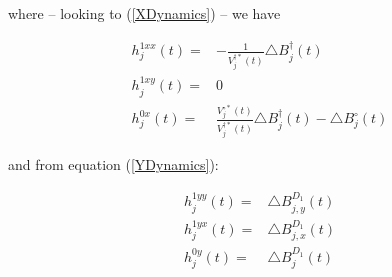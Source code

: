 \documentclass{article}
\newcommand{\1}[1]{\mathbbm{1}_{\left\lbrace #1 \right\rbrace}}
\theoremstyle{break}
\theoremstyle{remark}
\numberwithin{equation}{section}
\begin{document}
\begin{appendices}
where -- looking to (\ref{XDynamics}) -- we have

\begin{align*}
	h_j^{1xx}(t) =& -\frac{1}{V_j^{\dagger *}(t)} \triangle B_j^{\dagger}(t) \\
	h_j^{1xy}(t) =& 0\\
	h_j^{0x}(t) =&  \frac{V_j^{\circ *}(t)}{V_j^{\dagger *}(t)} \triangle B_j^{\dagger}(t) - \triangle B_j^{\circ}(t)
\end{align*}

and from equation (\ref{YDynamics}):

\begin{align*}
	h_j^{1yy}(t) =&  \triangle B_{j,y}^{D_1}(t) \\
	h_j^{1yx}(t) =& \triangle B_{j,x}^{D_1}(t) \\
	h_j^{0y}(t) =&  \triangle B_{j}^{D_1}(t)
\end{align*}



\end{appendices}
\end{document}
